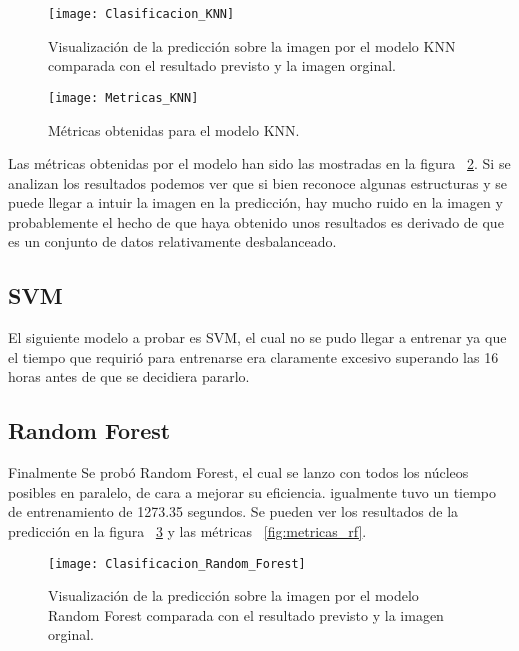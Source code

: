 \begin{figure}[H]
	\centering
	\texttt{[image: Clasificacion\_KNN]}
	\caption[Visualización de la predicción sobre la imagen KNN]{Visualización de la predicción sobre la imagen por el modelo KNN comparada con el resultado previsto y la imagen orginal.}
	\label{fig:prediccion_knn}
\end{figure}

\begin{figure}[H]
	\centering
	\texttt{[image: Metricas\_KNN]}
	\caption[Métricas obtenidas para el modelo KNN]{Métricas obtenidas para el modelo KNN.}
	\label{fig:metricas_knn}
\end{figure}

Las métricas obtenidas por el modelo han sido las mostradas en la figura ~\ref{fig:metricas_knn}. 
Si se analizan los resultados podemos ver que si bien reconoce algunas estructuras y se puede llegar a intuir la imagen en la predicción, hay mucho ruido en la imagen y probablemente el hecho de que haya obtenido unos resultados es derivado de que es un conjunto de datos relativamente desbalanceado.

\subsection{SVM}
El siguiente modelo a probar es SVM, el cual no se pudo llegar a entrenar ya que el tiempo que requirió  para entrenarse era claramente excesivo superando las 16 horas antes de que se decidiera pararlo.

\subsection{Random Forest}
Finalmente Se probó Random Forest, el cual se lanzo con todos los núcleos posibles en paralelo, de cara a mejorar su eficiencia. igualmente tuvo un tiempo de entrenamiento de 1273.35 segundos. Se pueden ver los resultados de la predicción en la figura ~\ref{fig:prediccion_rf} y las métricas ~\ref{fig:metricas_rf}.


\begin{figure}[H]
	\centering
	\texttt{[image: Clasificacion\_Random\_Forest]}
	\caption[Visualización de la predicción sobre la imagen Random Forest]{Visualización de la predicción sobre la imagen por el modelo Random Forest comparada con el resultado previsto y la imagen orginal.}
	\label{fig:prediccion_rf}
\end{figure}

